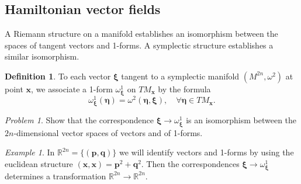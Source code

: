 \documentclass{book}
\numberwithin{equation}{section}
\theoremstyle{plain}
\theoremstyle{definition}
\newtheorem*{defn*}{Definition}
\theoremstyle{remark}
\theoremstyle{remark}
\newtheorem*{ex*}{Example}
\newtheorem*{prob*}{Problem}
\begin{document}
\subsection{Hamiltonian vector fields}



A Riemann structure on a manifold establishes an isomorphism between
the spaces of tangent vectors and 1-forms.
%
A symplectic structure establishes a similar isomorphism.


\begin{defn*}
%
To each vector $\pmb \xi$
tangent to a symplectic manifold $(M^{2n}, \omega^2)$
at point $\mathbf x$, we associate a 1-form $\omega^1_{\pmb \xi}$
on $TM_{\mathbf x}$ by the formula
$$
\omega^1_{\pmb \xi}(\pmb \eta) = \omega^2(\pmb \eta, \pmb \xi),
\quad \forall \pmb \eta \in TM_{\mathbf x}.
$$
\end{defn*}

\begin{prob*}
Show that the correspondence $\pmb \xi \rightarrow \omega^1_{\mathbf \xi}$
is an isomorphism between the $2n$-dimensional vector spaces of vectors
and of 1-forms.
\end{prob*}

\begin{ex*}
  In $\mathbb{R}^{2n}=\{(\mathbf p, \mathbf q)\}$
  we will identify vectors and 1-forms by using the euclidean structure
  $(\mathbf x, \mathbf x) = \mathbf p^2 + \mathbf q^2$.
  Then the correspondences $\pmb\xi \rightarrow \omega^1_{\pmb\xi}$
  determines a transformation
  $\mathbb{R}^{2n} \rightarrow \mathbb{R}^{2n}$.
\end{ex*}
\end{document}
